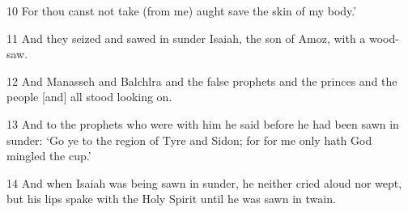 \par 10 For thou canst not take (from me) aught save the skin of my body.’

\par 11 And they seized and sawed in sunder Isaiah, the son of Amoz, with a wood-saw.

\par 12 And Manasseh and Balchlra and the false prophets and the princes and the people [and] all stood looking on.

\par 13 And to the prophets who were with him he said before he had been sawn in sunder: ‘Go ye to the region of Tyre and Sidon; for for me only hath God mingled the cup.’

\par 14 And when Isaiah was being sawn in sunder, he neither cried aloud nor wept, but his lips spake with the Holy Spirit until he was sawn in twain.

